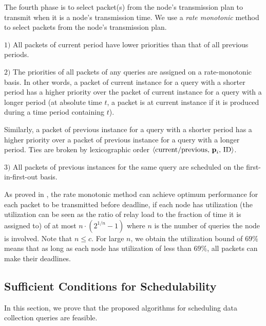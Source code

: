 \documentclass[conference,10pt]{IEEEtran}\usepackage{amsmath}
\def\period{{\textbf p}}
\def\qnum{{c}}
\begin{document}
The fourth phase is
  to select packet(s) from the node's transmission plan to
  transmit when it is a node's transmission time.
We use a \emph{rate monotonic} \cite{liu-layland-jacm73,
shih1993modified} method to select packets from the node's
transmission plan.

$1)$ All packets of current period have lower priorities than that
of all previous periods.

$2)$ The priorities of all packets of any queries are assigned on a
rate-monotonic basis. In other words, a packet of current instance
for a query with a
 shorter period has a higher priority over
 the packet of current instance for a query with a longer period
 (at absolute time $t$,
 a packet is at current instance if it is produced during a time
 period containing $t$).

Similarly, a packet of previous instance for a
 query with a shorter period has a higher priority over  a packet of
 previous instance for a
 query with a longer period. Ties are broken by lexicographic order
 $\langle \mbox{current/previous, $\period_i$, ID} \rangle$.

$3)$ All packets of previous instances for the same query are scheduled
 on the first-in-first-out basis.


As proved in \cite{liu-layland-jacm73}, the rate monotonic method
 can achieve optimum performance for each packet to be transmitted
 before deadline,
 if each
 node has utilization (the utilization can be seen as
 the ratio of relay load to the fraction of time it is assigned to) of
 at most $n\cdot (2^{1/n}-1)$ where $n$ is the
 number of queries the node is involved.
Note that $n\le\qnum$. For large $n$, we obtain the utilization
 bound of $69\%$ means
 that as long as each node has utilization of less than $69\%$, all
 packets can make their deadlines.

\subsection{Sufficient Conditions for Schedulability}

In this section, we prove that the proposed algorithms for scheduling data collection queries
 are feasible.
\end{document}

